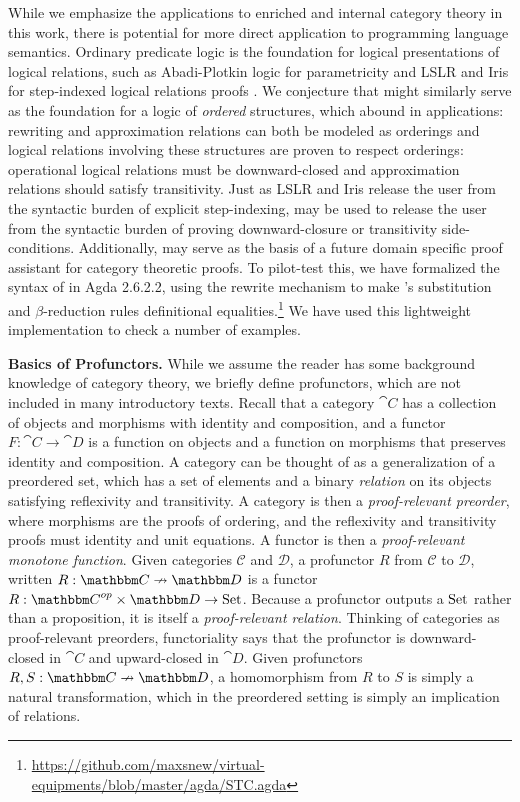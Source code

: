 \documentclass{llncs}
\begin{document}
While we emphasize the applications to enriched and internal category
theory in this work, there is potential for more direct application to
programming language semantics.
%
Ordinary predicate logic is the foundation for logical presentations of
logical relations, such as Abadi-Plotkin logic for parametricity and
LSLR and Iris for step-indexed logical relations proofs
\cite{abadi-plotkin,lslr,iris}.
%
We conjecture that \vett{} might similarly serve as the foundation for
a logic of \emph{ordered} structures, which abound in applications:
rewriting and approximation relations can both be modeled as orderings
and logical relations involving these structures are proven to respect
orderings: operational logical relations must be downward-closed and
approximation relations should satisfy transitivity.
%
Just as LSLR and Iris release the user from the syntactic burden of
explicit step-indexing, \vett{} may be used to release the user from
the syntactic burden of proving downward-closure or transitivity
side-conditions.
%
Additionally, \vett{} may serve as the basis of a future domain specific
proof assistant for category theoretic proofs.  To pilot-test this, we
have formalized the syntax of \vett{} in Agda 2.6.2.2, using the rewrite
mechanism to make \vett's substitution and $\beta$-reduction rules
definitional
equalities.\footnote{\url{https://github.com/maxsnew/virtual-equipments/blob/master/agda/STC.agda}}
We have used this lightweight implementation to check a number of
examples.  

\textbf{Basics of Profunctors.}  While we assume the reader has some
background knowledge of category theory, we briefly define profunctors,
which are not included in many introductory texts.  Recall that a
category $\cat C$ has a collection of objects and morphisms with
identity and composition, and a functor $F : \cat C \to \cat D$ is a
function on objects and a function on morphisms that preserves identity
and composition.  A category can be thought of as a generalization of a
preordered set, which has a set of elements and a binary \emph{relation}
on its objects satisfying reflexivity and transitivity.  A category is
then a \emph{proof-relevant preorder}, where morphisms are the proofs of
ordering, and the reflexivity and transitivity proofs must identity and
unit equations. A functor is then a \emph{proof-relevant monotone
  function}.  Given categories $\mathcal C$ and $\mathcal D$, a
profunctor $R$ from $\mathcal C$ to $\mathcal D$, written $R : \cat C
\pto \cat D$ is a functor $R : {\cat C}^{op} \times {\cat D} \to \Set$.
Because a profunctor outputs a $\textrm{Set}$ rather than a proposition, it is
itself a \emph{proof-relevant relation}.  Thinking of categories as
proof-relevant preorders, functoriality says that the profunctor is
downward-closed in $\cat C$ and upward-closed in $\cat D$.  Given
profunctors $R, S : \cat C \pto \cat D$, a homomorphism from $R$ to $S$
is simply a natural transformation, which in the preordered setting is
simply an implication of relations.
\end{document}
